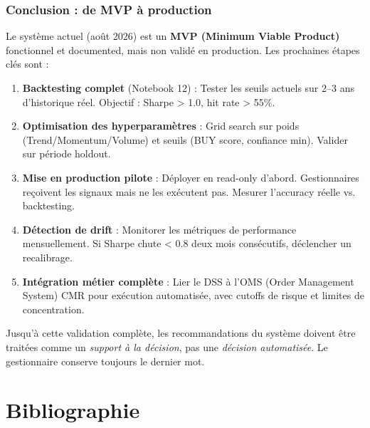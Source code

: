 \documentclass{rapportENSIAS} %
\begin{document}
\subsection{Conclusion : de MVP à production}

\noindent
Le système actuel (août 2026) est un \textbf{MVP (Minimum Viable Product)} fonctionnel et documented, mais non validé en production. Les prochaines étapes clés sont :

\begin{enumerate}
    \item \textbf{Backtesting complet} (Notebook 12) : Tester les seuils actuels sur 2–3 ans d'historique réel. Objectif : Sharpe > 1.0, hit rate > 55\%.
    \item \textbf{Optimisation des hyperparamètres} : Grid search sur poids (Trend/Momentum/Volume) et seuils (BUY score, confiance min). Valider sur période holdout.
    \item \textbf{Mise en production pilote} : Déployer en read-only d'abord. Gestionnaires reçoivent les signaux mais ne les exécutent pas. Mesurer l'accuracy réelle vs. backtesting.
    \item \textbf{Détection de drift} : Monitorer les métriques de performance mensuellement. Si Sharpe chute < 0.8 deux mois consécutifs, déclencher un recalibrage.
    \item \textbf{Intégration métier complète} : Lier le DSS à l'OMS (Order Management System) CMR pour exécution automatisée, avec cutoffs de risque et limites de concentration.
\end{enumerate}

\noindent
Jusqu'à cette validation complète, les recommandations du système doivent être traitées comme un \textit{support à la décision}, pas une \textit{décision automatisée}. Le gestionnaire conserve toujours le dernier mot.

\chapter*{Bibliographie}
{}
\end{document}
